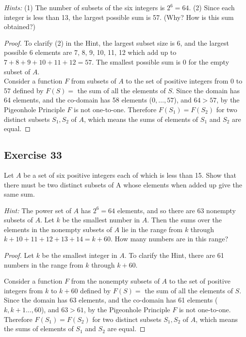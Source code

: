 \documentclass[14pt]{extarticle}
\begin{document}
{\it Hints:} (1) The number of subsets of the six integers
is \(2^6 = 64\). (2) Since each integer is less than 13,
the largest possible sum is 57. (Why? How is this sum obtained?)

\begin{proof}
     To clarify (2) in the Hint, the largest subset size is 6, and the largest possible 6 elements are 7, 8, 9, 10, 11, 12
     which add up to \(7+8+9+10+11+12 = 57\). The smallest possible sum is 0 for the empty subset of \(A\). \\
     Consider a function \(F\) from subsets of \(A\) to the set of positive integers from 0 to 57 defined by \(F(S) = \)
     the sum of all the elements of \(S\). Since the domain has 64 elements, and the co-domain has 58 elements (\(0,\ldots,
     57\)), and  \(64 > 57\), by the Pigeonhole Principle \(F\) is not one-to-one. Therefore \(F(S_1) = F(S_2)\) for two
     distinct subsets \(S_1, S_2\) of \(A\), which means the sums of elements of \(S_1\) and \(S_2\) are equal.
\end{proof}

\subsection{Exercise 33}
Let \(A\) be a set of six positive integers each of which is less than 15. Show that there must be two distinct
subsets of A whose elements when added up give the same sum.

     {\it Hint:} The power set of \(A\) has \(2^6 = 64\) elements, and so there are 63 nonempty subsets of \(A\).
Let \(k\) be the smallest number in \(A\). Then the sums over the elements in the nonempty subsets of \(A\) lie in
the range from \(k\) through \(k + 10 + 11 + 12 + 13 + 14 = k + 60\). How many numbers are in this range?

\begin{proof}
     Let \(k\) be the smallest integer in \(A\). To clarify the Hint, there are 61 numbers in the range from \(k\) through
     \(k+60\).

     Consider a function \(F\) from the nonempty subsets of \(A\) to the set of positive integers from \(k\) to \(k+60\)
     defined by \(F(S) = \) the sum of all the elements of \(S\). Since the domain has 63 elements, and the co-domain
     has 61 elements (\(k, k+1 \ldots, 60\)), and \(63 > 61\), by the Pigeonhole Principle \(F\) is not one-to-one.
     Therefore \(F(S_1) = F(S_2)\) for two distinct subsets \(S_1, S_2\) of \(A\), which means the sums of elements of
     \(S_1\) and \(S_2\) are equal.
\end{proof}
\end{document}
